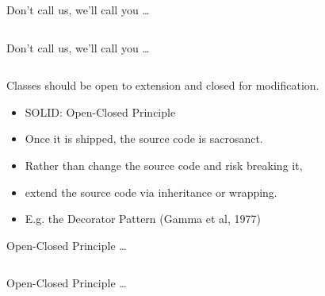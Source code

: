 \documentclass{beamer}
\begin{document}
\begin{frame}{Don't call us, we'll call you \ldots}
    \vspace{0cm}
    \begin{columns}
        \column{\dimexpr\paperwidth-40pt}
        
    \end{columns}
\end{frame}

\begin{frame}{Don't call us, we'll call you \ldots}
    \vspace{0cm}
    \begin{columns}
        \column{\dimexpr\paperwidth-40pt}
        
    \end{columns}
\end{frame}

\begin{frame}{Classes should be open to extension and closed for modification.}
    \begin{itemize}
        \item SOLID: Open-Closed Principle
        \item Once it is shipped, the source code is sacrosanct.
        \item Rather than change the source code and risk breaking it, 
        \item extend the source code via inheritance or wrapping. 
        \item E.g. the Decorator Pattern (Gamma et al, 1977)
    \end{itemize}
\end{frame}

\begin{frame}{Open-Closed Principle \ldots}
    \vspace{0cm}
    \begin{columns}
        \column{\dimexpr\paperwidth-40pt}
        
    \end{columns}
\end{frame}

\begin{frame}{Open-Closed Principle \ldots}
    \vspace{0cm}
    \begin{columns}
        \column{\dimexpr\paperwidth-40pt}
        
    \end{columns}
\end{frame}
\end{document}
